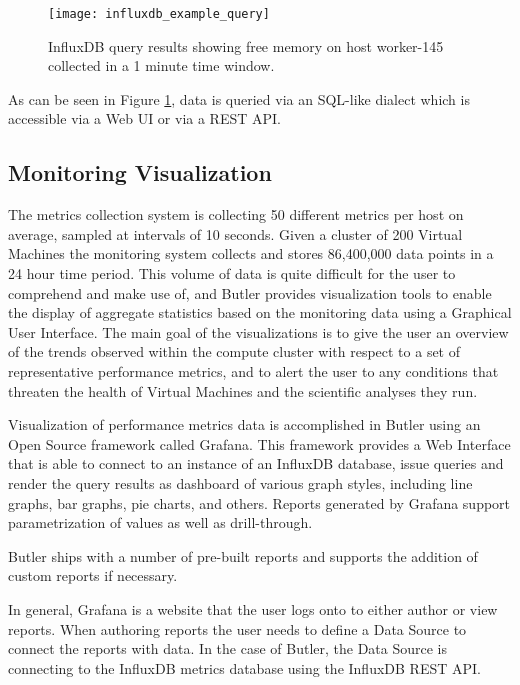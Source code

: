 \begin{figure}[h]
\texttt{[image: influxdb\_example\_query]}
\centering
\caption {InfluxDB query results showing free memory on host worker-145 collected in a 1 minute time window.}
\label{fig:influxdb_example_query}
\end{figure}

As can be seen in Figure \ref{fig:influxdb_example_query}, data is queried via an SQL-like dialect which is accessible via a Web UI or via a REST\autocite[Chapter~5]{fielding2000architectural} API.

\subsection{Monitoring Visualization}

The metrics collection system is collecting 50 different metrics per host on average, sampled at intervals of 10 seconds. Given a cluster of 200 Virtual Machines the monitoring system collects and stores 86,400,000 data points in a 24 hour time period. This volume of data is quite difficult for the user to comprehend and make use of, and Butler provides visualization tools to enable the display of aggregate statistics based on the monitoring data using a Graphical User Interface. The main goal of the visualizations is to give the user an overview of the trends observed within the compute cluster with respect to a set of representative performance metrics, and to alert the user to any conditions that threaten the health of Virtual Machines and the scientific analyses they run.

Visualization of performance metrics data is accomplished in Butler using an Open Source framework called Grafana\autocite{Grafana.net}. This framework provides a Web Interface that is able to connect to an instance of an InfluxDB database, issue queries and render the query results as dashboard of various graph styles, including line graphs, bar graphs, pie charts, and others. Reports generated by Grafana support parametrization of values as well as drill-through.

Butler ships with a number of pre-built reports and supports the addition of custom reports if necessary.

In general, Grafana is a website that the user logs onto to either author or view reports. When authoring reports the user needs to define a Data Source to connect the reports with data. In the case of Butler, the Data Source is connecting to the InfluxDB metrics database using the InfluxDB REST API.

